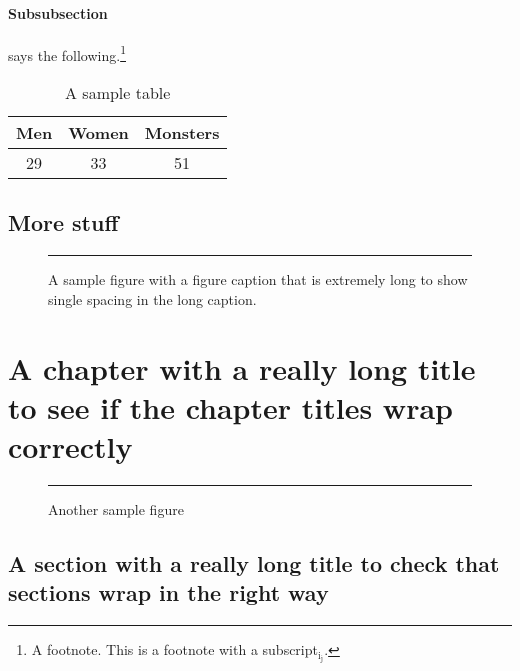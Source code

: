 \documentclass[lscape]{msu-thesis}
\begin{document}
\subsubsection{Subsubsection}
\begin{exe}
\ex\label{1}
\begin{xlist}
\end{xlist}
\end{exe}
\lipsum[1]
\lipsum[2]\cite{Munn1999} says the following.\footnote{A footnote. This is a footnote with a subscript$_{\text{i}_{\text{j}}}$.  \lipsum[9]} \lipsum[2]
\begin{table}
\centering
\begin{tabular}{ccc}
\toprule
Men & Women & Monsters\\
\midrule
29 & 33 & 51\\
\bottomrule
\end{tabular}
\caption{A sample table}
\end{table}

\lipsum[3]
\section{More stuff}
\lipsum[4]\cite{Munn2005}
\begin{figure}
\centering
{\color{gray!40}\rule{2in}{3in}}
\caption[A sample figure]{A sample figure with a figure caption that is extremely long to show single spacing in the long caption.}
\end{figure}
\lipsum[5]
\lipsum[10]
\chapter{A chapter with a really long title to see if the chapter titles wrap correctly}
\lipsum
\begin{figure}
\centering
{\color{gray!40}\rule{4in}{2in}}
\caption{Another sample figure}
\end{figure}
\lipsum[6]
\section{A section with a really long title to check that sections wrap in the right way}
\end{document}
